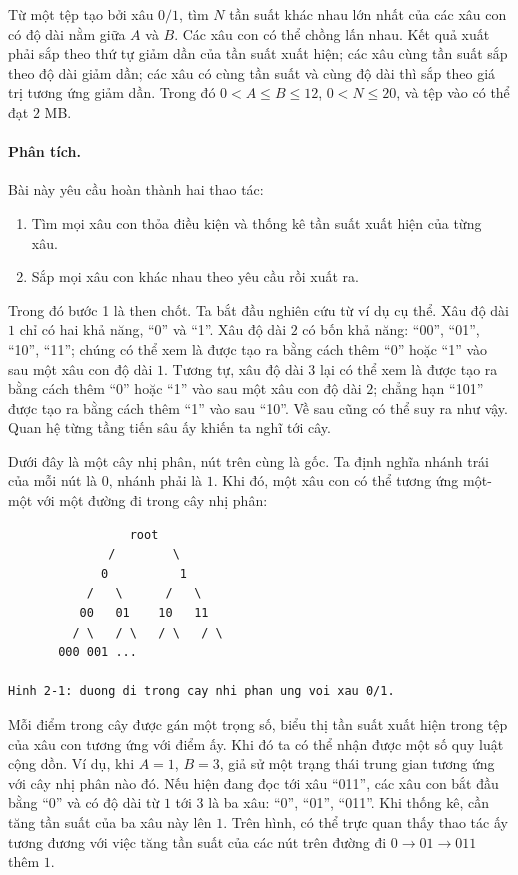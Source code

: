\documentclass[11pt]{article}
\begin{document}
Từ một tệp tạo bởi xâu \(0/1\), tìm \(N\) tần suất khác nhau lớn nhất của các
xâu con có độ dài nằm giữa \(A\) và \(B\). Các xâu con có thể chồng lấn nhau.
Kết quả xuất phải sắp theo thứ tự giảm dần của tần suất xuất hiện; các xâu
cùng tần suất sắp theo độ dài giảm dần; các xâu có cùng tần suất và cùng độ
dài thì sắp theo giá trị tương ứng giảm dần. Trong đó
\(0<A\le B\le 12\), \(0<N\le 20\), và tệp vào có thể đạt \(2\) MB.

\paragraph{Phân tích.}
Bài này yêu cầu hoàn thành hai thao tác:
\begin{enumerate}
  \item Tìm mọi xâu con thỏa điều kiện và thống kê tần suất xuất hiện của
  từng xâu.
  \item Sắp mọi xâu con khác nhau theo yêu cầu rồi xuất ra.
\end{enumerate}

Trong đó bước 1 là then chốt. Ta bắt đầu nghiên cứu từ ví dụ cụ thể. Xâu độ
dài \(1\) chỉ có hai khả năng, ``0'' và ``1''. Xâu độ dài \(2\) có bốn khả
năng: ``00'', ``01'', ``10'', ``11''; chúng có thể xem là được tạo ra bằng
cách thêm ``0'' hoặc ``1'' vào sau một xâu con độ dài \(1\). Tương tự, xâu
độ dài \(3\) lại có thể xem là được tạo ra bằng cách thêm ``0'' hoặc ``1''
vào sau một xâu con độ dài \(2\); chẳng hạn ``101'' được tạo ra bằng cách
thêm ``1'' vào sau ``10''. Về sau cũng có thể suy ra như vậy. Quan hệ từng
tầng tiến sâu ấy khiến ta nghĩ tới cây.

Dưới đây là một cây nhị phân, nút trên cùng là gốc. Ta định nghĩa nhánh trái
của mỗi nút là \(0\), nhánh phải là \(1\). Khi đó, một xâu con có thể tương
ứng một-một với một đường đi trong cây nhị phân:

\begin{verbatim}
                 root
              /        \
             0          1
           /   \      /   \
          00   01    10   11
         / \   / \   / \   / \
       000 001 ...

Hinh 2-1: duong di trong cay nhi phan ung voi xau 0/1.
\end{verbatim}

Mỗi điểm trong cây được gán một trọng số, biểu thị tần suất xuất hiện trong
tệp của xâu con tương ứng với điểm ấy. Khi đó ta có thể nhận được một số quy
luật cộng dồn. Ví dụ, khi \(A=1\), \(B=3\), giả sử một trạng thái trung gian
tương ứng với cây nhị phân nào đó. Nếu hiện đang đọc tới xâu ``011'', các xâu
con bắt đầu bằng ``0'' và có độ dài từ \(1\) tới \(3\) là ba xâu: ``0'',
``01'', ``011''. Khi thống kê, cần tăng tần suất của ba xâu này lên \(1\).
Trên hình, có thể trực quan thấy thao tác ấy tương đương với việc tăng tần
suất của các nút trên đường đi \(0\to 01\to 011\) thêm \(1\).
\end{document}
